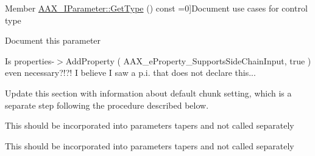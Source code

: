\begin{DoxyRefList}
Member \hyperlink{a00108_a0c096b4092b2146d9aa0413bceeaac48}{A\+A\+X\+\_\+\+I\+Parameter\+:\+:Get\+Type} () const =0]Document use cases for control type  
\item[\label{a00383__todo000050}%
\hypertarget{a00383__todo000050}{}%
Member \hyperlink{a00108_a809a5c7f712ed2e5c55e30b6d5557c59}{A\+A\+X\+\_\+\+I\+Parameter\+:\+:Set\+Taper\+Delegate} (\hyperlink{a00115}{A\+A\+X\+\_\+\+I\+Taper\+Delegate\+Base} \&in\+Taper\+Delegate, bool in\+Preserve\+Value)=0]Document this parameter  
\item[\label{a00383__todo000001}%
\hypertarget{a00383__todo000001}{}%
Module \hyperlink{a00338}{additional\+Features\+\_\+\+Sidechain} ]Is properties-\/$>$Add\+Property ( A\+A\+X\+\_\+e\+Property\+\_\+\+Supports\+Side\+Chain\+Input, true ) even necessary?!?! I believe I saw a p.\+i. that does not declare this... 
\item[\label{a00383__todo000002}%
\hypertarget{a00383__todo000002}{}%
Module \hyperlink{a00353}{advanced\+Topics\+\_\+parameter\+Updates\+\_\+sequences} ]Update this section with information about default chunk setting, which is a separate step following the procedure described below. 
\item[\label{a00383__todo000017}%
\hypertarget{a00383__todo000017}{}%
global\+Scope$>$ Member \hyperlink{a00181_a596d5ea393d43f6f798a838aefe3cecd}{D\+B\+To\+Gain} (double d\+B)]This should be incorporated into parameters\textquotesingle{} tapers and not called separately  
\item[\label{a00383__todo000016}%
\hypertarget{a00383__todo000016}{}%
global\+Scope$>$ Member \hyperlink{a00181_a76f29f12e35c093e5c198b8d0e27b6f9}{Gain\+To\+D\+B} (double a\+Gain)]This should be incorporated into parameters\textquotesingle{} tapers and not called separately 
\end{DoxyRefList}